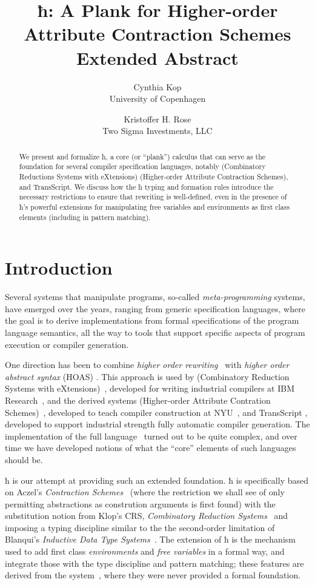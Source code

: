 \documentclass[letterpaper,10pt]{proc}
\title{ ħ: A Plank for Higher-order Attribute Contraction Schemes \\ Extended Abstract }
\author{%
  Cynthia Kop \\
  University of Copenhagen
  \and
  Kristoffer H. Rose \\
  Two Sigma Investments, LLC
}
\begin{document}
\maketitle

\begin{abstract}\noindent
  We present and formalize ħ, a core (or ``plank'') calculus that can serve as the foundation
  for several compiler specification languages, notably \CRSX (Combinatory Reductions Systems with
  eXtensions) \HAX (Higher-order Attribute Contraction Schemes), and \textsf{TransScript}.
  We discuss how the ħ typing and formation rules introduce the necessary restrictions to
  ensure that rewriting is well-defined, even in the presence of ħ's powerful extensions for
  manipulating free variables and environments as first class elements (including in pattern
  matching).
\end{abstract}


\section{Introduction}\label{sec:intro}

Several systems that manipulate programs, so-called \emph{meta-programming} systems, have emerged
over the years, ranging from generic specification languages, where the goal is to derive
implementations from formal specifications of the program language semantics, all the way to tools
that support specific aspects of program execution or compiler generation.

One direction has been to combine \emph{higher order rewriting}~\cite{Jouannaud:klop2005} with
\emph{higher order abstract syntax} (HOAS) \cite{PfenningElliot:pldi1988}. This approach is used by
\CRSX (Combinatory Reduction Systems with eXtensions)~\cite{Rose:1996}, developed for writing
industrial compilers at IBM Research~\cite{Rose:rta2011}, and the derived systems \HAX (Higher-order
Attribute Contration Schemes)~\cite{Rose:ts2015}, developed to teach compiler construction at
NYU~\cite{RoseRose:cims2015}, and \textsf{TransScript} \cite{}, developed to support industrial
strength fully automatic compiler generation.  The implementation of the full \CRSX
language~\cite{crsx} turned out to be quite complex, and over time we have developed notions of what
the ``core'' elements of such languages should be.

ħ is our attempt at providing such an extended foundation.  ħ is specifically based on Aczel's
\emph{Contraction Schemes}~\cite{Aczel:1978} (where the restriction we shall see of only permitting
abstractions as constrution arguments is first found) with the substitution notion from Klop's CRS,
\emph{Combinatory Reduction Systems}~\cite{Klop+:tcs1993} and imposing a typing discipline similar
to the the second-order limitation of Blanqui's \emph{Inductive Data Type
  Systems}~\cite{BlanquiJouannaudOkada:tcs2002}. The extension of ħ is the mechanism used to add
first class \emph{environments} and \emph{free variables} in a formal way, and integrate those with
the type discipline and pattern matching; these features are derived from the \CRSX
system~\cite{Rose:rta2011}, where they were never provided a formal foundation.
\end{document}
